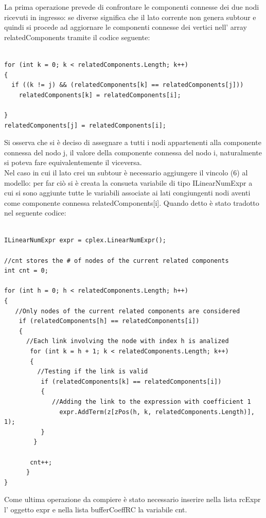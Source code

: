 \documentclass[11pt]{article}
\begin{document}
La prima operazione prevede di confrontare le componenti connesse dei due nodi ricevuti in ingresso: se diverse significa che il lato corrente non genera subtour e quindi si procede ad aggiornare le componenti connesse dei vertici nell' array relatedComponents tramite il codice seguente:

\begin{lstlisting}

for (int k = 0; k < relatedComponents.Length; k++)
{
  if ((k != j) && (relatedComponents[k] == relatedComponents[j]))
    relatedComponents[k] = relatedComponents[i];
                    
}
relatedComponents[j] = relatedComponents[i];

\end{lstlisting}

Si osserva che si \`e  deciso di assegnare a tutti i nodi appartenenti alla componente connessa del nodo j, il valore della componente connessa del nodo i, naturalmente si poteva fare equivalentemente il viceversa.\\
Nel caso in cui il lato crei un subtour \`e necessario aggiungere il vincolo (6) al modello: per far ci\`o si \`e creata la consueta variabile di tipo ILinearNumExpr a cui si sono aggiunte tutte le variabili associate ai lati congiungenti nodi aventi come componente connessa relatedComponents[i]. Quando detto \`e  stato tradotto nel seguente codice:

\begin{lstlisting}

ILinearNumExpr expr = cplex.LinearNumExpr();

//cnt stores the # of nodes of the current related components
int cnt = 0;

for (int h = 0; h < relatedComponents.Length; h++)
{
   //Only nodes of the current related components are considered
    if (relatedComponents[h] == relatedComponents[i])
    {
      //Each link involving the node with index h is analized
       for (int k = h + 1; k < relatedComponents.Length; k++)
       {
         //Testing if the link is valid
          if (relatedComponents[k] == relatedComponents[i])
          {
             //Adding the link to the expression with coefficient 1
               expr.AddTerm(z[zPos(h, k, relatedComponents.Length)], 1);
          }
        }

       cnt++;
      }
}
\end{lstlisting}
 
Come ultima operazione da compiere \`e stato necessario inserire nella lista rcExpr l' oggetto expr e nella lista bufferCoeffRC la variabile cnt.
\end{document}
